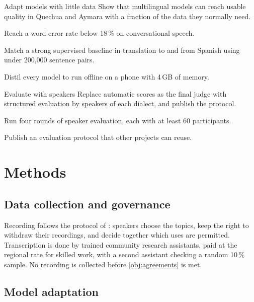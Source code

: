 \documentclass[11pt]{article}
\begin{document}
\begin{aim}{Adapt models with little data}\label{aim:models}
  Show that multilingual models can reach usable quality in Quechua and Aymara
  with a fraction of the data they normally need.
  \begin{objectives}
    \item Reach a word error rate below 18\,\% on conversational speech.
    \item Match a strong supervised baseline in translation to and from
          Spanish using under 200,000 sentence pairs.
    \item Distil every model to run offline on a phone with 4\,GB of memory.
  \end{objectives}
\end{aim}

\begin{aim}{Evaluate with speakers}\label{aim:evaluation}
  Replace automatic scores as the final judge with structured evaluation by
  speakers of each dialect, and publish the protocol.
  \begin{objectives}
    \item Run four rounds of speaker evaluation, each with at least 60
          participants.
    \item Publish an evaluation protocol that other projects can reuse.
  \end{objectives}
\end{aim}

\section{Methods}\label{sec:methods}

\subsection{Data collection and governance}

Recording follows the protocol of \textcite{tupa2022governance}: speakers
choose the topics, keep the right to withdraw their recordings, and decide
together which uses are permitted. Transcription is done by trained community
research assistants, paid at the regional rate for skilled work, with a
second assistant checking a random 10\,\% sample. No recording is collected
before \cref{obj:agreements} is met.

\subsection{Model adaptation}
\end{document}
